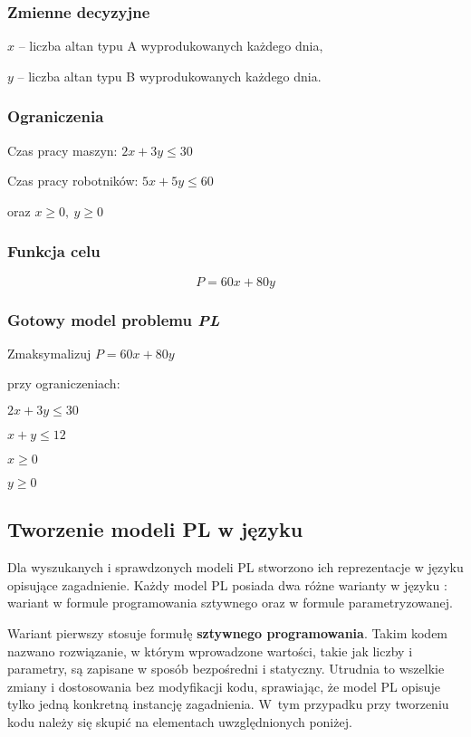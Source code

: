 \subsubsection*{Zmienne decyzyjne}

$x$ – liczba altan typu A wyprodukowanych każdego dnia,

$y$ – liczba altan typu B wyprodukowanych każdego dnia.

\subsubsection*{Ograniczenia}

Czas pracy maszyn: $2x + 3y \leq 30$

Czas pracy robotników: $5x + 5y \leq 60$

oraz $x \geq 0, \ y \geq 0$


\subsubsection*{Funkcja celu}
\[
    P = 60x + 80y
\]

\subsubsection*{Gotowy model problemu \textit{PL}}
    Zmaksymalizuj $P = 60x + 80y$

przy ograniczeniach:

    $2x + 3y \leq 30$
    
    $x + y \leq 12$
    
    $x  \geq 0$
    
    $y \geq 0$


\subsection{Tworzenie modeli PL w języku }

Dla wyszukanych i sprawdzonych modeli PL stworzono ich reprezentacje w języku  opisujące zagadnienie. %
Każdy model PL posiada dwa różne warianty w języku  : wariant w formule programowania sztywnego oraz w formule parametryzowanej. %

Wariant pierwszy stosuje formułę \textbf{sztywnego programowania}. Takim kodem nazwano rozwiązanie, w którym wprowadzone wartości, takie jak liczby i parametry, są zapisane w sposób bezpośredni i statyczny. Utrudnia to wszelkie zmiany i dostosowania bez modyfikacji kodu, sprawiając, że model PL opisuje tylko jedną konkretną instancję zagadnienia. W~tym przypadku przy tworzeniu kodu   należy się skupić na elementach uwzględnionych poniżej.

